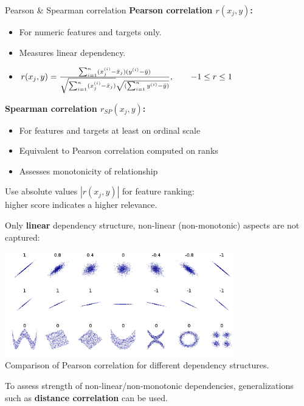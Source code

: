 \documentclass[11pt,compress,t,notes=noshow, xcolor=table]{beamer}
\begin{document}
  \begin{vbframe}{Pearson \& Spearman correlation}
  \textbf{Pearson correlation $r(x_j, y)$: }
  \begin{itemize}
    \item For numeric features and targets only.
    \item Measures linear dependency.
    \item $ r(x_j, y) = \frac{\sum_{i=1}^n (x^{(i)}_j - \bar{x}_j) (y^{(i)} - \bar{y})}{\sqrt{\sum_{i=1}^n (x^{(i)}_j - \bar{x}_j)} \sqrt{(\sum_{i=1}^n y^{(i)} - \bar{y})}},\qquad -1 \le r \le 1$
  \end{itemize}
  \vspace{0.4cm}
  \textbf{Spearman correlation $r_{SP}(x_j, y)$:}
  \begin{itemize}
    \item For features and targets at least on ordinal scale
    \item Equivalent to Pearson correlation computed on ranks
    \item Assesses monotonicity of relationship
  \end{itemize}
  \lz
  Use absolute values $|r(x_j, y)|$ for feature ranking:\\
  higher score indicates a higher relevance.

  \framebreak

  Only \textbf{linear} dependency structure, non-linear (non-monotonic) aspects are not captured:

  \lz

  \begin{center}
\includegraphics[width=0.75\textwidth]{figure_man/correlation_example.png}\\
\footnotesize{Comparison of Pearson correlation for different dependency structures.}
  \end{center}
  \vspace{0.1cm}
  To assess strength of non-linear/non-monotonic dependencies, generalizations such as \textbf{distance correlation} can be used.


\end{vbframe}
\end{document}
